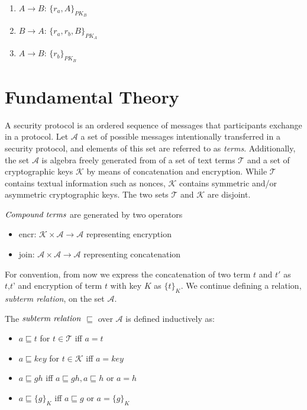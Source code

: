 \begin{enumerate}
\item $A \rightarrow B$: $\{r_a, A\}_{PK_B}$
\item $B \rightarrow A$: $\{r_a,r_b, B\}_{PK_A}$
\item $A \rightarrow B$: $\{r_b\}_{PK_B}$
\end{enumerate}

\section{Fundamental Theory}

A security protocol is an ordered sequence of messages that participants exchange in a protocol. Let $\mathcal{A}$ a set of possible messages intentionally transferred in a security protocol, and elements of this set are referred to as \textit{terms}. Additionally, the set $\mathcal{A}$ is algebra freely generated from of a set of text terms $\mathcal{T}$ and a set of cryptographic keys $\mathcal{K}$ by means of concatenation and encryption. While $\mathcal{T}$ contains textual information such as nonces, $\mathcal{K}$ contains symmetric and/or asymmetric cryptographic keys. The two sets $\mathcal{T}$ and $\mathcal{K}$ are disjoint. 

\begin{Definition} $\emph{Compound terms}$ are generated by two operators
\begin{itemize}
	\item encr: $\mathcal{K} \times \mathcal{A} \rightarrow \mathcal{A}$ representing encryption
	\item join: $\mathcal{A} \times \mathcal{A} \rightarrow \mathcal{A}$ representing concatenation
\end{itemize}
\end{Definition}

For convention, from now we express the concatenation of two term $t$ and $t'$ as $\textit{t,t'}$ and encryption of term $t$ with key $K$ as $\{t\}_K$. We continue defining a relation, \textit{subterm relation}, on the set $\mathcal{A}$. 

\begin{Definition} The $\emph{subterm relation}$ $\sqsubseteq$ over $\mathcal{A}$ is defined inductively as: 
	\begin{itemize}
		\item $a \sqsubseteq t $ for $t \in \mathcal{T}$   iff $a = t $
		\item $a \sqsubseteq key $ for $t \in \mathcal{K}$   iff $a = key $
		\item $a \sqsubseteq gh $ iff $a \sqsubseteq gh, a \sqsubseteq h $ or $ a= h $
		\item $a \sqsubseteq \{g\}_K $ iff $a \sqsubseteq g $ or $a = \{g\}_K$
	\end{itemize} 
\end{Definition}

